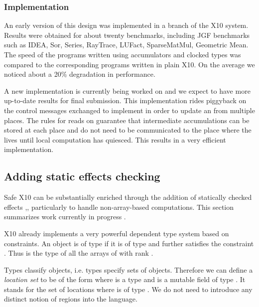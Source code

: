 
\subsubsection{Implementation}
An early version of this design was implemented in a branch of the X10
system. Results were obtained for about twenty benchmarks, including
JGF benchmarks such as IDEA, Sor, Series, RayTrace, LUFact,
SparseMatMul, Geometric Mean.  The speed of the programs written using
accumulators and clocked types was compared to the corresponding
programs written in plain X10. On the average we noticed about a 20\%
degradation in performance. 

A new implementation is currently being worked on and we expect to
have more up-to-date results for final submission. This implementation
rides piggyback on the control messages exchanged to implement
 in order to update an  from multiple
places. The rules for reads on  guarantee that intermediate
accumulations can be stored at each place and do not need to be
communicated to the place where the  lives until local
computation has quiesced. 
This results in a very efficient implementation. 

\subsection{Adding static effects checking}

Safe X10 can be substantially enriched
through the addition of statically checked effects
\cite{Gifford:1986:IFI:319838.319848},\cite{DPJ}, particularly to
handle non-array-based computations. This section summarizes work
currently in progress \cite{effects-constrained-types}.

X10 already implements a very powerful dependent type system based on
constraints. An object  is of type  if it is of
type  and further satisfies the constraint
. Thus  is the type of all
the arrays of  with rank .

Types classify objects, i.e.{} types specify sets of
objects. Therefore we can define a {\em location set} to be of the form
 where  is a type and  is a mutable field of
type . It stands for the set of locations  where
 is of type . We do not need to introduce any distinct
notion of regions into the language.


